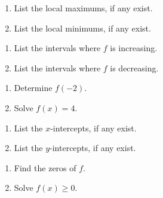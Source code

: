 \documentclass{ximera}
\begin{document}
\begin{multicols}{2}
\begin{enumerate}
\setcounter{enumi}{\value{HW}}

\item  List the local maximums, if any exist.
\item  List the local minimums, if any exist.

\setcounter{HW}{\value{enumi}}
\end{enumerate}
\end{multicols}

\begin{multicols}{2}
\begin{enumerate}
\setcounter{enumi}{\value{HW}}

\item  List the intervals where $f$ is increasing.
\item  List the intervals where $f$ is decreasing.

\setcounter{HW}{\value{enumi}}
\end{enumerate}
\end{multicols}


\begin{multicols}{2}
\begin{enumerate}
\setcounter{enumi}{\value{HW}}

\item  Determine $f(-2)$.
\item  Solve $f(x) = 4$.

\setcounter{HW}{\value{enumi}}
\end{enumerate}
\end{multicols}

\begin{multicols}{2}
\begin{enumerate}
\setcounter{enumi}{\value{HW}}

\item  List the $x$-intercepts, if any exist.
\item  List the $y$-intercepts, if any exist.

\setcounter{HW}{\value{enumi}}
\end{enumerate}
\end{multicols}

\begin{multicols}{2}
\begin{enumerate}
\setcounter{enumi}{\value{HW}}

\item  Find the zeros of $f$.
\item  Solve $f(x) \geq 0$.

\setcounter{HW}{\value{enumi}}
\end{enumerate}
\end{multicols}
\end{document}

